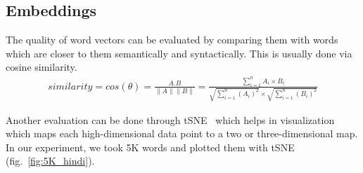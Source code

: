 \documentclass[11pt,a4paper]{article}
\begin{document}
\subsection{Embeddings}
The quality of word vectors can be evaluated by comparing them with words which are closer to them semantically and syntactically. This is usually done via cosine similarity.
\begin{align}
similarity=cos(\theta)=\frac{A.B}{\|A\|\|B\|}=\frac{\sum_{i=1}^{n}A_i \times B_i}{\sqrt{\sum_{i=1}^{n}(A_i)^2}\times \sqrt{\sum_{i=1}^{n}(B_i)^2}}
\end{align}

Another evaluation can be done through tSNE~\cite{Maaten:08} which helps in visualization which maps each high-dimensional data point to a two or three-dimensional map. In our experiment, we took 5K words and plotted
them with tSNE (fig.~\ref{fig:5K_hindi}). 



\end{document}
